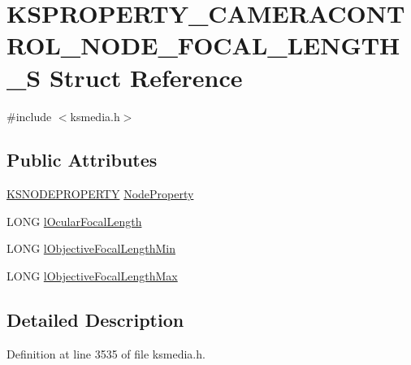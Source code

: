 \hypertarget{struct_k_s_p_r_o_p_e_r_t_y___c_a_m_e_r_a_c_o_n_t_r_o_l___n_o_d_e___f_o_c_a_l___l_e_n_g_t_h___s}{}\section{K\+S\+P\+R\+O\+P\+E\+R\+T\+Y\+\_\+\+C\+A\+M\+E\+R\+A\+C\+O\+N\+T\+R\+O\+L\+\_\+\+N\+O\+D\+E\+\_\+\+F\+O\+C\+A\+L\+\_\+\+L\+E\+N\+G\+T\+H\+\_\+S Struct Reference}
\label{struct_k_s_p_r_o_p_e_r_t_y___c_a_m_e_r_a_c_o_n_t_r_o_l___n_o_d_e___f_o_c_a_l___l_e_n_g_t_h___s}


{\ttfamily \#include $<$ksmedia.\+h$>$}

\subsection*{Public Attributes}
\begin{DoxyCompactItemize}
\item 
\hyperlink{struct_k_s_n_o_d_e_p_r_o_p_e_r_t_y}{K\+S\+N\+O\+D\+E\+P\+R\+O\+P\+E\+R\+TY} \hyperlink{struct_k_s_p_r_o_p_e_r_t_y___c_a_m_e_r_a_c_o_n_t_r_o_l___n_o_d_e___f_o_c_a_l___l_e_n_g_t_h___s_a76207534d1d9f27b29ef7ee2a90bbf0c}{Node\+Property}
\item 
L\+O\+NG \hyperlink{struct_k_s_p_r_o_p_e_r_t_y___c_a_m_e_r_a_c_o_n_t_r_o_l___n_o_d_e___f_o_c_a_l___l_e_n_g_t_h___s_ab743583ccaeca6fe40793a936b8eed8e}{l\+Ocular\+Focal\+Length}
\item 
L\+O\+NG \hyperlink{struct_k_s_p_r_o_p_e_r_t_y___c_a_m_e_r_a_c_o_n_t_r_o_l___n_o_d_e___f_o_c_a_l___l_e_n_g_t_h___s_a9b01ae599a87ca5825cb610a6489a5ef}{l\+Objective\+Focal\+Length\+Min}
\item 
L\+O\+NG \hyperlink{struct_k_s_p_r_o_p_e_r_t_y___c_a_m_e_r_a_c_o_n_t_r_o_l___n_o_d_e___f_o_c_a_l___l_e_n_g_t_h___s_add7fc234d5ef6083c8f3576aa38cdc12}{l\+Objective\+Focal\+Length\+Max}
\end{DoxyCompactItemize}


\subsection{Detailed Description}


Definition at line 3535 of file ksmedia.\+h.




